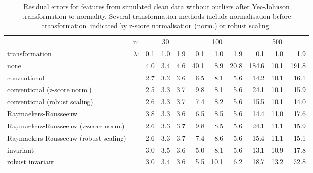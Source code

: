 \documentclass[
  a4paper,
]{article}
\begin{document}
\begin{table}
\begin{center}
\caption{Residual errors for features from simulated clean data without outliers after Yeo-Johnson transformation to normality.
Several transformation methods include normalisation before transformation, indicated by z-score normalisation (norm.) or robust scaling.}
\label{tab:clean-transformation-appendix-residuals-yj}
\small{
\begin{tabular}{l | l r r r r r r r r r}

\toprule
& n: & \multicolumn{3}{c}{30} & \multicolumn{3}{c}{100} & \multicolumn{3}{c}{500} \\
transformation & $\lambda$: & 0.1 & 1.0 & 1.9 & 0.1 & 1.0 & 1.9 & 0.1 & 1.0 & 1.9 \\

\midrule

none                                  & & 4.0 & 3.4 & 4.6 & 40.1 &  8.9 & 20.8 & 184.6 & 10.1 & 191.8 \\
conventional                          & & 2.7 & 3.3 & 3.6 &  6.5 &  8.1 &  5.6 &  14.2 & 10.1 &  16.1 \\
conventional (z-score norm.)          & & 2.5 & 3.3 & 3.7 &  9.8 &  8.1 &  5.6 &  24.1 & 10.1 &  15.9 \\
conventional (robust scaling)         & & 2.6 & 3.3 & 3.7 &  7.4 &  8.2 &  5.6 &  15.5 & 10.1 &  14.0 \\
Raymaekers-Rousseeuw                  & & 3.8 & 3.3 & 3.6 &  6.5 &  8.5 &  5.6 &  14.4 & 11.0 &  17.6 \\
Raymaekers-Rousseeuw (z-score norm.)  & & 2.6 & 3.3 & 3.7 &  9.8 &  8.5 &  5.6 &  24.1 & 11.1 &  15.9 \\
Raymaekers-Rousseeuw (robust scaling) & & 2.6 & 3.3 & 3.7 &  7.4 &  8.6 &  5.6 &  15.4 & 11.1 &  15.1 \\
invariant                             & & 3.0 & 3.5 & 3.6 &  5.0 &  8.1 &  5.6 &  13.1 & 10.9 &  17.8 \\
robust invariant                      & & 3.0 & 3.4 & 3.6 &  5.5 & 10.1 &  6.2 &  18.7 & 13.2 &  32.8 \\

\bottomrule
\end{tabular}
}
\end{center}
\end{table}
\end{document}
